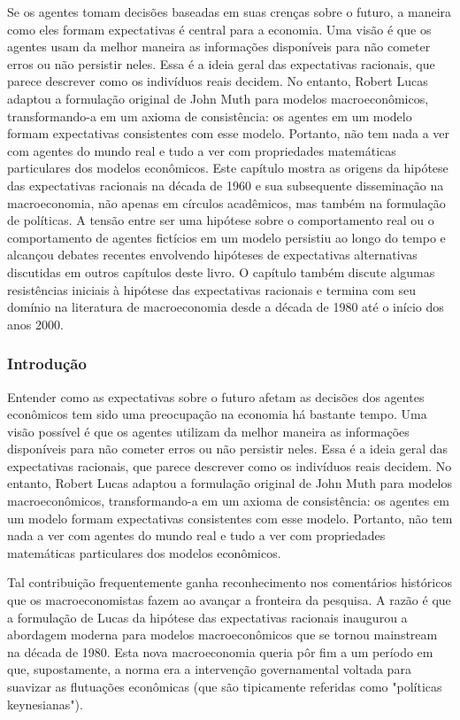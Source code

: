 \documentclass[12pt]{article}
\begin{document}
Se os agentes tomam decisões baseadas em suas crenças sobre o futuro, a maneira como eles formam expectativas é central para a economia. Uma visão é que os agentes usam da melhor maneira as informações disponíveis para não cometer erros ou não persistir neles. Essa é a ideia geral das expectativas racionais, que parece descrever como os indivíduos reais decidem. No entanto, Robert Lucas adaptou a formulação original de John Muth para modelos macroeconômicos, transformando-a em um axioma de consistência: os agentes em um modelo formam expectativas consistentes com esse modelo. Portanto, não tem nada a ver com agentes do mundo real e tudo a ver com propriedades matemáticas particulares dos modelos econômicos. Este capítulo mostra as origens da hipótese das expectativas racionais na década de 1960 e sua subsequente disseminação na macroeconomia, não apenas em círculos acadêmicos, mas também na formulação de políticas. A tensão entre ser uma hipótese sobre o comportamento real ou o comportamento de agentes fictícios em um modelo persistiu ao longo do tempo e alcançou debates recentes envolvendo hipóteses de expectativas alternativas discutidas em outros capítulos deste livro. O capítulo também discute algumas resistências iniciais à hipótese das expectativas racionais e termina com seu domínio na literatura de macroeconomia desde a década de 1980 até o início dos anos 2000.

\subsubsection{\textbf{Introdução}}
Entender como as expectativas sobre o futuro afetam as decisões dos agentes econômicos tem sido uma preocupação na economia há bastante tempo. Uma visão possível é que os agentes utilizam da melhor maneira as informações disponíveis para não cometer erros ou não persistir neles. Essa é a ideia geral das expectativas racionais, que parece descrever como os indivíduos reais decidem. No entanto, Robert Lucas adaptou a formulação original de John Muth para modelos macroeconômicos, transformando-a em um axioma de consistência: os agentes em um modelo formam expectativas consistentes com esse modelo. Portanto, não tem nada a ver com agentes do mundo real e tudo a ver com propriedades matemáticas particulares dos modelos econômicos.

Tal contribuição frequentemente ganha reconhecimento nos comentários históricos que os macroeconomistas fazem ao avançar a fronteira da pesquisa. A razão é que a formulação de Lucas da hipótese das expectativas racionais inaugurou a abordagem moderna para modelos macroeconômicos que se tornou mainstream na década de 1980. Esta nova macroeconomia queria pôr fim a um período em que, supostamente, a norma era a intervenção governamental voltada para suavizar as flutuações econômicas (que são tipicamente referidas como "políticas keynesianas").
\end{document}
